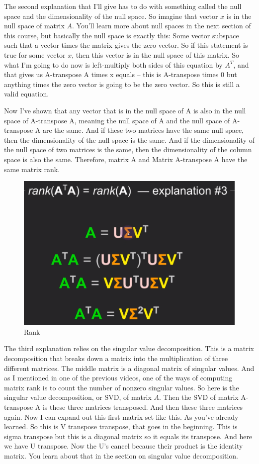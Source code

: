 \documentclass[fleqn,10pt]{olplainarticle}
\theoremstyle{definition}
\theoremstyle{remark}
\begin{document}
The second explanation that I'll give has to do with something called the null space and the dimensionality of the null space. So imagine that vector $x$ is in the null space of matrix $A$. You'll learn more about null spaces in the next section of this course, but basically the null space is exactly this: Some vector subspace such that a vector times the matrix gives the zero vector. So if this statement is true for some vector $x$, then this vector is in the null space of this matrix. So what I'm going to do now is left-multiply both sides of this equation by $A^T$, and that gives us A-transpose A times x equals -- this is A-transpose times 0 but anything times the zero vector is going to be the zero vector. So this is still a valid equation.

Now I've shown that any vector that is in the null space of A is also in the null space of A-transpose A, meaning the null space of A and the null space of A-transpose A are the same. And if these two matrices have the same null space, then the dimensionality of the null space is the same. And if the dimensionality of the null space of two matrices is the same, then the dimensionality of the column space is also the same. Therefore, matrix A and Matrix A-transpose A have the same matrix rank.

\begin{figure}[ht]
	\centering
	\includegraphics[width=0.5\linewidth]{images/rank-25.png}
	\caption{Rank}
	\label{fig:rank_25}
\end{figure}

The third explanation relies on the singular value decomposition. This is a matrix decomposition that breaks down a matrix into the multiplication of three different matrices. The middle matrix is a diagonal matrix of singular values. And as I mentioned in one of the previous videos, one of the ways of computing matrix rank is to count the number of nonzero singular values. So here is the singular value decomposition, or SVD, of matrix $A$. Then the SVD of matrix A-transpose A is these three matrices transposed. And then these three matrices again. Now I can expand out this first matrix set like this. As you've already learned. So this is V transpose transpose, that goes in the beginning. This is sigma transpose but this is a diagonal matrix so it equals its transpose. And here we have U transpose. Now the U's cancel because their product is the identity matrix. You learn about that in the section on singular value decomposition.
\end{document}
